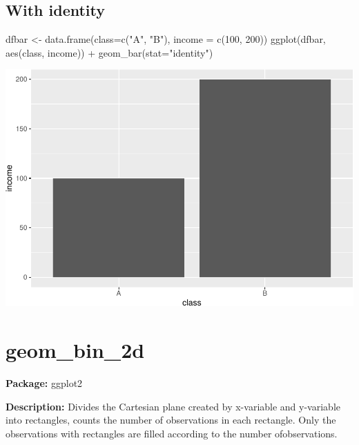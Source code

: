 \documentclass[
]{book}
\newenvironment{Shaded}{\begin{snugshade}}{\end{snugshade}}
\newcommand{\AttributeTok}[1]{\textcolor[rgb]{0.77,0.63,0.00}{#1}}
\newcommand{\DecValTok}[1]{\textcolor[rgb]{0.00,0.00,0.81}{#1}}
\newcommand{\FunctionTok}[1]{\textcolor[rgb]{0.00,0.00,0.00}{#1}}
\newcommand{\NormalTok}[1]{#1}
\newcommand{\OtherTok}[1]{\textcolor[rgb]{0.56,0.35,0.01}{#1}}
\newcommand{\SpecialCharTok}[1]{\textcolor[rgb]{0.00,0.00,0.00}{#1}}
\newcommand{\StringTok}[1]{\textcolor[rgb]{0.31,0.60,0.02}{#1}}
\begin{document}
\hypertarget{with-identity}{%
\subsection{With identity}\label{with-identity}}

\begin{Shaded}
\begin{Highlighting}[]
\NormalTok{dfbar }\OtherTok{\textless{}{-}} \FunctionTok{data.frame}\NormalTok{(}\AttributeTok{class=}\FunctionTok{c}\NormalTok{(}\StringTok{"A"}\NormalTok{, }\StringTok{"B"}\NormalTok{),  }\AttributeTok{income =} \FunctionTok{c}\NormalTok{(}\DecValTok{100}\NormalTok{, }\DecValTok{200}\NormalTok{))}
\FunctionTok{ggplot}\NormalTok{(dfbar, }\FunctionTok{aes}\NormalTok{(class, income)) }\SpecialCharTok{+}
  \FunctionTok{geom\_bar}\NormalTok{(}\AttributeTok{stat=}\StringTok{"identity"}\NormalTok{)}
\end{Highlighting}
\end{Shaded}

\includegraphics{Data-Visualisation-geom-Encyclopedia_files/figure-latex/unnamed-chunk-22-1.pdf}

\hypertarget{geom_bin_2d}{%
\section{geom\_bin\_2d}\label{geom_bin_2d}}

\textbf{Package: } ggplot2 \autocite{R-ggplot2}

\textbf{Description: } Divides the Cartesian plane created by x-variable and y-variable into rectangles, counts the number of observations in each rectangle. Only the observations with rectangles are filled according to the number ofobservations.
\end{document}
